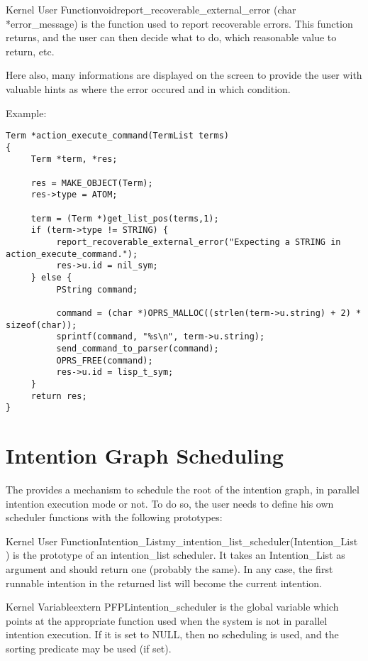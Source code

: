 \begin{typefn}{Kernel User Function}{void}{report\_recoverable\_external\_error} {(char *error\_message)}
is the function used to report recoverable errors. This function returns, and
the user can then decide what to do, which reasonable value to return, etc.

Here also, many informations are displayed on the screen to provide the user
with valuable hints as where the error occured and in which condition.

Example:
\begin{verbatim}
Term *action_execute_command(TermList terms)
{
     Term *term, *res;

     res = MAKE_OBJECT(Term);
     res->type = ATOM;

     term = (Term *)get_list_pos(terms,1);
     if (term->type != STRING) {
          report_recoverable_external_error("Expecting a STRING in action_execute_command.");
          res->u.id = nil_sym;
     } else {
          PString command;

          command = (char *)OPRS_MALLOC((strlen(term->u.string) + 2) * sizeof(char));
          sprintf(command, "%s\n", term->u.string);
          send_command_to_parser(command);
          OPRS_FREE(command);
          res->u.id = lisp_t_sym;
     }
     return res;
}
\end{verbatim}
\end{typefn}

\section{Intention Graph Scheduling}

The \CPK{} provides a mechanism to schedule the root of the intention graph, in
parallel intention execution mode or not. To
do so, the user needs to define his own scheduler functions with the following
prototypes:

\begin{typefn}{Kernel User Function}{Intention\_List}{my\_intention\_list\_scheduler}{(Intention\_List )}
is the prototype of an intention\_list scheduler. It takes an Intention\_List as
argument and should return one (probably the same). In any case, the first
runnable intention in the returned list will become the current intention.
\end{typefn}

\begin{typevr}{Kernel Variable}{extern PFPL}{intention\_scheduler}
is the global variable which points at the appropriate function used when the
system is not in parallel intention execution. If it is set to NULL, then no
scheduling is used, and the sorting predicate may be used (if set).
\end{typevr}

